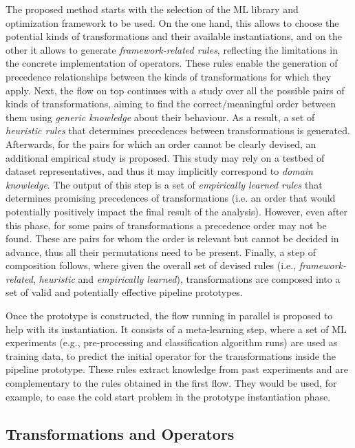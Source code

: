 The proposed method starts with the selection of the ML library and optimization framework to be used. On the one hand, this allows to choose the potential kinds of transformations and their available instantiations, and on the other it allows to generate \textit{framework-related rules}, reflecting the limitations in the concrete implementation of operators. These rules enable the generation of precedence relationships between the kinds of transformations for which they apply.
Next, the flow on top continues with a study over all the possible pairs of kinds of transformations, aiming to find the correct/meaningful order between them using \textit{generic knowledge} about their behaviour. As a result, a set of \textit{heuristic rules} that determines precedences between transformations is generated. 
Afterwards, for the pairs for which an order cannot be clearly devised, an additional empirical study is proposed. This study may rely on a testbed of dataset representatives, and thus it may implicitly correspond to \textit{domain knowledge}. The output of this step is a set of \textit{empirically learned rules} that determines promising precedences of transformations (i.e. an order that would potentially positively impact the final result of the analysis). However, even after this phase, for some pairs of transformations a precedence order may not be found. These are pairs for whom the order is relevant but cannot be decided in advance, thus all their permutations need to be present. Finally, a step of composition follows, where given the overall set of devised rules (i.e., \textit{framework-related}, \textit{heuristic} and \textit{empirically learned}), transformations are composed into a set of valid and potentially effective pipeline prototypes. 

Once the prototype is constructed, the flow running in parallel is proposed to help with its instantiation. It consists of a meta-learning step, where a set of ML experiments (e.g., pre-processing and classification algorithm runs) are used as training data, to predict the initial operator for the transformations inside the pipeline prototype. These rules extract knowledge from past experiments and are complementary to the rules obtained in the first flow. They would be used, for example, to ease the cold start problem in the prototype instantiation phase.

\subsection{Transformations and Operators}

